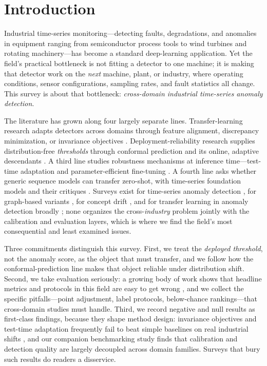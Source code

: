 \section{Introduction}
\label{sec:intro}

Industrial time-series monitoring---detecting faults, degradations, and anomalies in equipment ranging from semiconductor process tools to wind turbines and rotating machinery---has become a standard deep-learning application. Yet the field's practical bottleneck is not fitting a detector to one machine; it is making that detector work on the \emph{next} machine, plant, or industry, where operating conditions, sensor configurations, sampling rates, and fault statistics all change. This survey is about that bottleneck: \emph{cross-domain industrial time-series anomaly detection}.

The literature has grown along four largely separate lines. Transfer-learning research adapts detectors across domains through feature alignment, discrepancy minimization, or invariance objectives \cite{dacad2024,2310_14790,2503_08749,2407_13978,2502_00545}. Deployment-reliability research supplies distribution-free \emph{thresholds} through conformal prediction and its online, adaptive descendants \cite{lei2018,aci2021,conformalpid2023,dtaci2022,2212_03463,2407_06390}. A third line studies robustness mechanisms at inference time---test-time adaptation and parameter-efficient fine-tuning \cite{petsa2025,2312_11976,2412_08435}. A fourth line asks whether generic sequence models can transfer zero-shot, with time-series foundation models and their critiques \cite{chronos2024,2502_03383,2505_11349,2510_26777}. Surveys exist for time-series anomaly detection \cite{2002_04236,2501_15196,2308_00393,2408_03747}, for graph-based variants \cite{2302_00058,2307_03759}, for concept drift \cite{2506_15831}, and for transfer learning in anomaly detection broadly \cite{survey2023}; none organizes the cross-\emph{industry} problem jointly with the calibration and evaluation layers, which is where we find the field's most consequential and least examined issues.

Three commitments distinguish this survey. First, we treat the \emph{deployed threshold}, not the anomaly score, as the object that must transfer, and we follow how the conformal-prediction line makes that object reliable under distribution shift. Second, we take evaluation seriously: a growing body of work shows that headline metrics and protocols in this field are easy to get wrong \cite{2109_05257,2308_13068,2409_13053,2405_12096,2511_18739,2607_11969}, and we collect the specific pitfalls---point adjustment, label protocols, below-chance rankings---that cross-domain studies must handle. Third, we record negative and null results as first-class findings, because they shape method design: invariance objectives and test-time adaptation frequently fail to beat simple baselines on real industrial shifts \cite{2204_01637,2212_11080,2505_11349}, and our companion benchmarking study finds that calibration and detection quality are largely decoupled across domain families. Surveys that bury such results do readers a disservice.

